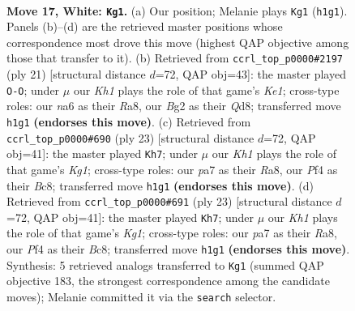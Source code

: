 \documentclass[11pt]{article}
\begin{document}
\clearpage

\begin{figure}[p]\centering
\begin{subfigure}{0.46\textwidth}\centering
\resizebox{\linewidth}{!}{%
\newchessgame
\chessboard[
  setfen={1rbq1r1k/p3b2p/npp2np1/3p1p2/3P1P2/P4NP1/QP1NP1BP/R1B1R2K w - - 2 17},
  showmover=false,
  pgfstyle=straightmove, color=movearrow, markmove={h1-g1}
]}
\caption{}
\end{subfigure}\hfill
\begin{subfigure}{0.46\textwidth}\centering
\resizebox{\linewidth}{!}{%
\newchessgame
\chessboard[
  setfen={r2qk2r/1b2bppp/p1nppn2/1p6/4PP2/P1NB1N2/1PP3PP/R1BQ1R1K b kq - 0 11},
  showmover=false,
  pgfstyle=straightmove, color=movearrow, markmove={e8-g8}
]}
\caption{}
\end{subfigure}
\\[4pt]
\begin{subfigure}{0.46\textwidth}\centering
\resizebox{\linewidth}{!}{%
\newchessgame
\chessboard[
  setfen={r1bq1rk1/pp3pb1/2np1npp/2p5/2P1PB2/2NP4/PPNQB1PP/R4RK1 b - - 2 12},
  showmover=false,
  pgfstyle=straightmove, color=movearrow, markmove={g8-h7}
]}
\caption{}
\end{subfigure}\hfill
\begin{subfigure}{0.46\textwidth}\centering
\resizebox{\linewidth}{!}{%
\newchessgame
\chessboard[
  setfen={r1bq1rk1/pp3pb1/2np1npp/2p5/2P1PB2/2NP4/PPNQB1PP/R4RK1 b - - 2 12},
  showmover=false,
  pgfstyle=straightmove, color=movearrow, markmove={g8-h7}
]}
\caption{}
\end{subfigure}
\caption{\textbf{Move 17, White: \texttt{Kg1}.} (a) Our position; Melanie plays \texttt{Kg1} (\texttt{h1g1}). Panels (b)--(d) are the retrieved master positions whose correspondence most drove this move (highest QAP objective among those that transfer to it). (b) Retrieved from \texttt{ccrl\_top\_p0000\#2197} (ply 21) [structural distance $d$=72, QAP obj=43]: the master played \texttt{O-O}; under $\mu$ our \emph{Kh1} plays the role of that game's \emph{Ke1}; cross-type roles: our \emph{n}a6 as their \emph{R}a8, our \emph{B}g2 as their \emph{Q}d8; transferred move \texttt{h1g1} \textbf{(endorses this move)}. (c) Retrieved from \texttt{ccrl\_top\_p0000\#690} (ply 23) [structural distance $d$=72, QAP obj=41]: the master played \texttt{Kh7}; under $\mu$ our \emph{Kh1} plays the role of that game's \emph{Kg1}; cross-type roles: our \emph{p}a7 as their \emph{R}a8, our \emph{P}f4 as their \emph{B}c8; transferred move \texttt{h1g1} \textbf{(endorses this move)}. (d) Retrieved from \texttt{ccrl\_top\_p0000\#691} (ply 23) [structural distance $d$=72, QAP obj=41]: the master played \texttt{Kh7}; under $\mu$ our \emph{Kh1} plays the role of that game's \emph{Kg1}; cross-type roles: our \emph{p}a7 as their \emph{R}a8, our \emph{P}f4 as their \emph{B}c8; transferred move \texttt{h1g1} \textbf{(endorses this move)}. Synthesis: 5 retrieved analogs transferred to \texttt{Kg1} (summed QAP objective 183, the strongest correspondence among the candidate moves); Melanie committed it via the \texttt{search} selector.}
\label{fig:thought-m32}
\end{figure}
\end{document}
